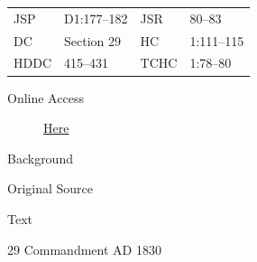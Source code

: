 				\begin{tabular}{p{0.5in}p{1in}p{0.5in}p{1in}}
				JSP	 	& D1:177--182	& JSR 		& 80--83	 \\
				DC	 	& Section 29	& HC 		& 1:111--115 \\
				HDDC 	& 415--431		& TCHC 		& 1:78--80 \\
				\end{tabular}
			
			\begin{description}
				\item[Online Access] \href{https://www.josephsmithpapers.org/paper-summary/revelation-september-1830-a-dc-29/1}{Here}
			\end{description}
			
			\begin{description}
				\item[Background]
			\end{description}
			
			
			\begin{description}
				\item[Original Source]
			\end{description}
			
			
			\begin{description}
				\item[Text]
			\end{description}
			
				\begin{tightcenter}
				29 Commandment AD 1830
				\end{tightcenter}
				
